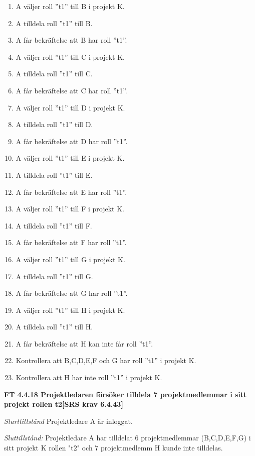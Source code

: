 \documentclass[a4paper]{article}
\begin{document}
\begin{enumerate}
\item A väljer roll ”t1” till B i projekt K.
\item A tilldela roll ”t1” till B. 
\item A får bekräftelse att B har roll ”t1”.
\item A väljer roll ”t1” till C i projekt K. 
\item A tilldela roll ”t1” till C. 
\item A får bekräftelse att C har roll ”t1”.
\item A väljer roll ”t1” till D i projekt K.
\item A tilldela roll ”t1” till D. 
\item A får bekräftelse att D har roll ”t1”.
\item A väljer roll ”t1” till E i projekt K. 
\item A tilldela roll ”t1” till E. 
\item A får bekräftelse att E har roll ”t1”.
\item A väljer roll ”t1” till F i projekt K.
\item A tilldela roll ”t1” till F.
\item A får bekräftelse att F har roll ”t1”.
\item A väljer roll ”t1” till G i projekt K. 
\item A tilldela roll ”t1” till G. 
\item A får bekräftelse att G har roll ”t1”.
\item A väljer roll ”t1” till H i projekt K. 
\item A tilldela roll ”t1” till H. 
\item A får bekräftelse att  H kan inte får roll ”t1”.
\item Kontrollera att B,C,D,E,F och G har roll ”t1” i projekt K.
\item Kontrollera att H har inte roll ”t1” i projekt K.
\end{enumerate}

\textbf{FT 4.4.18 Projektledaren försöker tilldela 7 projektmedlemmar i sitt projekt rollen t2[SRS krav 6.4.43]}

\emph{Starttillstånd} Projektledare A är inloggat.

\emph{Sluttillstånd:} Projektledare A  har tilldelat 6 projektmedlemmar (B,C,D,E,F,G) i sitt projekt K  rollen "t2" och 7 projektmedlemm H kunde inte tilldelas.
\end{document}
